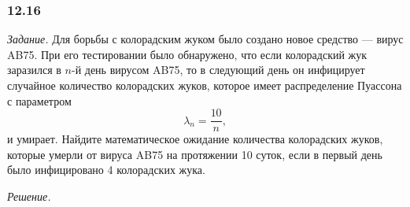 \subsubsection*{12.16}

\textit{Задание.} Для борьбы с колорадским жуком было создано новое средство --- вирус AB75.
При его тестировании было обнаружено,
что если колорадский жук заразился в $n$-й день вирусом AB75,
то в следующий день он инфицирует случайное количество колорадских жуков, которое имеет распределение Пуассона с параметром
$$ \lambda_n =
\frac{10}{n},$$
и умирает.
Найдите математическое ожидание количества колорадских жуков,
которые умерли от вируса AB75 на протяжении 10 суток, если в первый день было инфицировано 4 колорадских жука.

\textit{Решение.}
